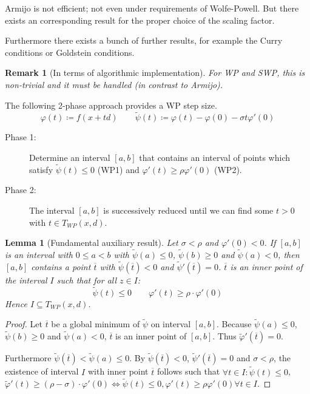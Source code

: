 \documentclass[a4paper]{article}
\newcounter{lecref}[subsection]
\numberwithin{lecref}{subsection}
\newtheorem{lemma}[lecref]{Lemma}
\newtheorem*{Remark}{Remark}
\begin{document}
Armijo is not efficient; not even under requirements of Wolfe-Powell.
But there exists an corresponding result for the proper choice of the scaling factor.

Furthermore there exists a bunch of further results, for example the Curry conditions or Goldstein conditions.

\begin{Remark}[In terms of algorithmic implementation]
	For WP and SWP, this is non-trivial and it must be handled (in contrast to Armijo).
\end{Remark}

The following 2-phase approach provides a WP step size.
\[ \varphi(t) \coloneqq f(x + td) \qquad \tilde\psi(t) \coloneqq \varphi(t) - \varphi(0) - \sigma t \varphi'(0) \]

\begin{description}
	\item[Phase 1:] Determine an interval $[a, b]$ that contains an interval of points which satisfy $\tilde\psi(t) \leq 0$ (WP1) and $\varphi'(t) \geq \rho \varphi'(0)$ (WP2).
	\item[Phase 2:] The interval $[a, b]$ is successively reduced until we can find some $t > 0$ with $t \in T_{WP}(x, d)$.
\end{description}

\begin{lemma}[Fundamental auxiliary result]
	\label{lemma:5.4.4}
	Let $\sigma < \rho$ and $\varphi'(0) < 0$.
	If $[a, b]$ is an interval with $0 \leq a < b$ with $\tilde\psi(a) \leq 0$, $\tilde\psi(b) \geq 0$ and $\tilde \psi(a) < 0$, then $[a, b]$ contains a point $\overline t$ with $\tilde \psi(\overline t) < 0$ and $\tilde\psi'(\overline t) = 0$.
	$\overline t$ is an inner point of the interval $I$ such that for all $z \in I$:
	\[ \tilde \psi(t) \leq 0 \qquad \varphi'(t) \geq \rho \cdot \varphi'(0) \]
	Hence $I \subseteq T_{WP}(x, d)$.
\end{lemma}

\begin{proof}
	Let $\overline t$ be a global minimum of $\tilde \psi$ on interval $[a, b]$.
	Because $\tilde\psi(a) \leq 0$, $\tilde\psi(b) \geq 0$ and $\tilde \psi(a) < 0$, $\overline t$ is an inner point of $[a, b]$. Thus $\tilde \varphi'(\overline t) = 0$.

	Furthermore $\tilde \psi(\overline t) < \tilde \psi(a) \leq 0$.
	By $\tilde \psi(\overline t) < 0$, $\tilde \psi'(\overline t) = 0$ and $\sigma < \rho$, the existence of interval $I$ with inner point $\overline t$ follows such that $\forall t \in I: \tilde \psi(t) \leq 0$, $\tilde \varphi'(t) \geq (\rho - \sigma) \cdot \varphi'(0) \iff \tilde \psi(t) \leq 0, \varphi'(t) \geq \rho \varphi'(0) \forall t \in I$.
\end{proof}
\end{document}
